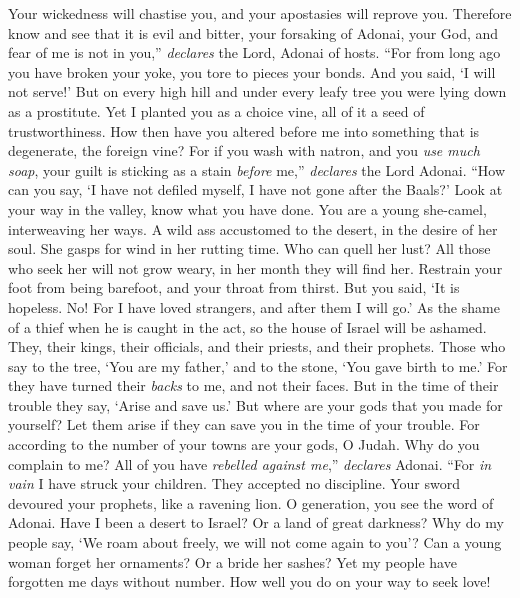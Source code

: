 \begin{biblechapter}
\verse Your wickedness will chastise you, 
and your apostasies will reprove you. 
Therefore know and see that it is evil and bitter, 
your forsaking of Adonai, your God, 
and fear of me is not in you,” 
\textit{declares} the Lord, Adonai of hosts.
\verse “For from long ago you have broken your yoke, 
you tore to pieces your bonds. 
And you said, ‘I will not serve!’ 
But on every high hill and under every leafy tree 
you were lying down as a prostitute.
\verse Yet I planted you as a choice vine, 
all of it a seed of trustworthiness. 
How then have you altered before me 
into something that is degenerate, the foreign vine?
\verse For if you wash with natron, 
and you \textit{use much soap}, 
your guilt is sticking as a stain \textit{before} me,” 
\textit{declares} the Lord Adonai.
\verse “How can you say, ‘I have not defiled myself, 
I have not gone after the Baals?’ 
Look at your way in the valley, 
know what you have done. 
You are a young she-camel, 
interweaving her ways.
\verse A wild ass accustomed to the desert, 
in the desire of her soul. 
She gasps for wind in her rutting time. 
Who can quell her lust? 
All those who seek her will not grow weary, 
in her month they will find her.
\verse Restrain your foot from being barefoot, 
and your throat from thirst. 
But you said, ‘It is hopeless. 
No! For I have loved strangers, 
and after them I will go.’
\verse As the shame of a thief when he is caught in the act, 
so the house of Israel will be ashamed. 
They, their kings, their officials, 
and their priests, and their prophets.
\verse Those who say to the tree, ‘You are my father,’ 
and to the stone, ‘You gave birth to me.’ 
For they have turned their \textit{backs} to me, and not their faces. 
But in the time of their trouble they say, ‘Arise and save us.’
\verse But where are your gods that you made for yourself? 
Let them arise if they can save you in the time of your trouble. 
For according to the number of your towns 
are your gods, O Judah.
\verse Why do you complain to me? 
All of you have \textit{rebelled against me},” \textit{declares} Adonai.
\verse “For \textit{in vain} I have struck your children. 
They accepted no discipline. 
Your sword devoured your prophets, 
like a ravening lion.
\verse O generation, you see the word of Adonai. 
Have I been a desert to Israel? Or a land of great darkness? 
Why do my people say, ‘We roam about freely, 
we will not come again to you’?
\verse Can a young woman forget her ornaments? Or a bride her sashes? 
Yet my people have forgotten me days without number.
\verse How well you do on your way to seek love! 

\end{biblechapter}
